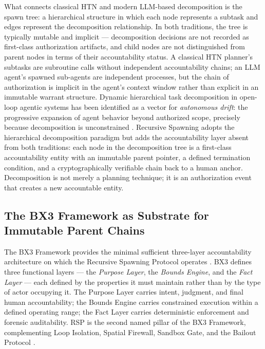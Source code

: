 What connects classical HTN and modern LLM-based decomposition is the spawn tree: a hierarchical structure in which each node represents a subtask and edges represent the decomposition relationship. In both traditions, the tree is typically mutable and implicit --- decomposition decisions are not recorded as first-class authorization artifacts, and child nodes are not distinguished from parent nodes in terms of their accountability status. A classical HTN planner's subtasks are subroutine calls without independent accountability chains; an LLM agent's spawned sub-agents are independent processes, but the chain of authorization is implicit in the agent's context window rather than explicit in an immutable warrant structure. Dynamic hierarchical task decomposition in open-loop agentic systems has been identified as a vector for \emph{autonomous drift}: the progressive expansion of agent behavior beyond authorized scope, precisely because decomposition is unconstrained \cite{autoGPT2023}. Recursive Spawning adopts the hierarchical decomposition paradigm but adds the accountability layer absent from both traditions: each node in the decomposition tree is a first-class accountability entity with an immutable parent pointer, a defined termination condition, and a cryptographically verifiable chain back to a human anchor. Decomposition is not merely a planning technique; it is an authorization event that creates a new accountable entity.

\subsection{The BX3 Framework as Substrate for Immutable Parent Chains}

The BX3 Framework provides the minimal sufficient three-layer accountability architecture on which the Recursive Spawning Protocol operates \cite{bx3-framework,bx3framework2026}. BX3 defines three functional layers --- the \textit{Purpose Layer}, the \textit{Bounds Engine}, and the \textit{Fact Layer} --- each defined by the properties it must maintain rather than by the type of actor occupying it. The Purpose Layer carries intent, judgment, and final human accountability; the Bounds Engine carries constrained execution within a defined operating range; the Fact Layer carries deterministic enforcement and forensic auditability. RSP is the second named pillar of the BX3 Framework, complementing Loop Isolation, Spatial Firewall, Sandbox Gate, and the Bailout Protocol \cite{bx3-framework,bansal2019}.


